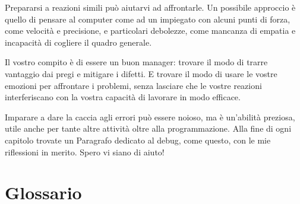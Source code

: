 \documentclass[10pt]{book}
\begin{document}
Prepararsi a reazioni simili può aiutarvi ad affrontarle. Un possibile approccio è quello di pensare al computer come ad un impiegato con alcuni punti di forza, come velocità e precisione, e particolari debolezze, come mancanza di empatia e incapacità di cogliere il quadro generale.

Il vostro compito è di essere un buon manager: trovare il modo di trarre vantaggio dai pregi e mitigare i difetti. E trovare il modo di usare le vostre emozioni per affrontare i problemi, senza lasciare che le vostre reazioni interferiscano con la vostra capacità di lavorare in modo efficace.

Imparare a dare la caccia agli errori può essere noioso, ma è un'abilità preziosa, utile anche per tante altre attività oltre alla programmazione. Alla fine di ogni capitolo trovate un Paragrafo dedicato al debug, come questo, con le mie riflessioni in merito. Spero vi siano di aiuto!

\section{Glossario}
\end{document}
